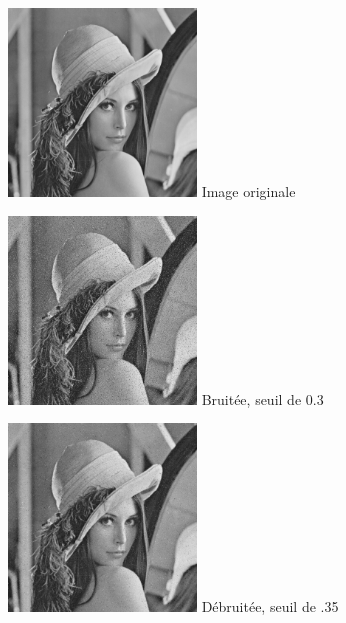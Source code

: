 \documentclass{article}
\begin{document}
		\begin{figure}[!ht]
			\centering
			\begin{minipage}[t]{5cm}
				\centering
				\includegraphics[width=5cm,height=5cm]{lena.jpg}
				Image originale
			\end{minipage}
			\begin{minipage}[t]{5cm}
				\centering
				\includegraphics[width=5cm,height=5cm]{Additive/noisy_30.jpg}
				Bruitée, seuil de 0.3
			\end{minipage}
			\begin{minipage}[t]{5cm}
				\centering
				\includegraphics[width=5cm,height=5cm]{Additive/algo1_30.jpg}
				Débruitée, seuil de .35
			\end{minipage}
		\end{figure}
		
\end{document}
